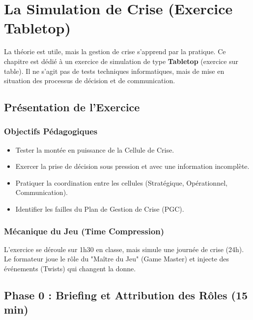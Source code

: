 \chapter{La Simulation de Crise (Exercice Tabletop)}
\label{chap:simcrise}

La théorie est utile, mais la gestion de crise s'apprend par la pratique. Ce chapitre est dédié à un exercice de simulation de type \textbf{Tabletop} (exercice sur table). Il ne s'agit pas de tests techniques informatiques, mais de mise en situation des processus de décision et de communication.

\section{Présentation de l'Exercice}

\subsection{Objectifs Pédagogiques}

\begin{itemize}
    \item Tester la montée en puissance de la Cellule de Crise.
    \item Exercer la prise de décision sous pression et avec une information incomplète.
    \item Pratiquer la coordination entre les cellules (Stratégique, Opérationnel, Communication).
    \item Identifier les failles du Plan de Gestion de Crise (PGC).
\end{itemize}

\subsection{Mécanique du Jeu (Time Compression)}

L'exercice se déroule sur 1h30 en classe, mais simule une journée de crise (24h).
Le formateur joue le rôle du "Maître du Jeu" (Game Master) et injecte des événements (Twists) qui changent la donne.

\section{Phase 0 : Briefing et Attribution des Rôles (15 min)}

